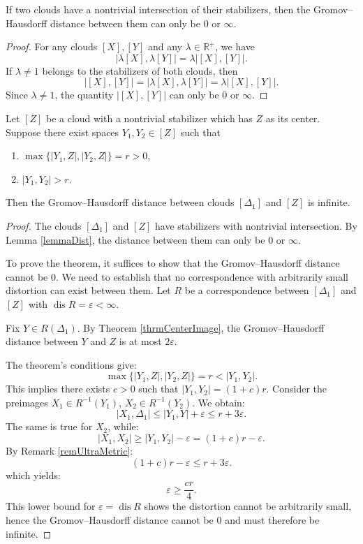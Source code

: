 \documentclass[leqno]{article}
\begin{document}
\begin{lemma}\label{lemmaDist}
    If two clouds have a nontrivial intersection of their stabilizers,
    then the Gromov--Hausdorff distance between them can only be $0$
    or $\infty$.
\end{lemma}

\begin{proof}
    For any clouds $[X], [Y]$ and any $\lambda \in \mathbb{R}^{+}$, we have
    $$
    \big|\lambda[X], \lambda[Y]\big| = \lambda\big|[X], [Y]\big|.
    $$
    If $\lambda \neq 1$ belongs to the stabilizers of both clouds, then
    $$
    \big|[X],[Y]\big| = \big|\lambda[X], \lambda[Y]\big| =
    \lambda\big|[X], [Y]\big|.
    $$
    Since $\lambda \neq 1$, the quantity $\big|[X],[Y]\big|$ can only
    be $0$ or $\infty$.
\end{proof}

\begin{theorem}\label{thrmDist}
    Let $[Z]$ be a cloud with a nontrivial stabilizer which has $Z$ as
    its center. Suppose there exist spaces $Y_{1}, Y_{2} \in [Z]$ such that
    \begin{enumerate}
        \item $\max\{ |Y_{1},Z|, |Y_{2}, Z| \} = r > 0$,
        \item $|Y_{1}, Y_{2}| > r$.
    \end{enumerate}
    Then the Gromov--Hausdorff distance between clouds $[\Delta_1]$ and
    $[Z]$ is infinite.
\end{theorem}

\begin{proof}
    The clouds $[\Delta_1]$ and $[Z]$ have stabilizers with nontrivial
    intersection. By Lemma \ref{lemmaDist}, the distance between them
    can only be $0$ or $\infty$.

    To prove the theorem, it suffices to show that the
    Gromov--Hausdorff distance cannot be $0$. We need to establish that
    no correspondence with arbitrarily small distortion can exist
    between them. Let $R$ be a correspondence between $[\Delta_1]$ and
    $[Z]$ with $\operatorname{dis} R = \varepsilon < \infty$.

    Fix $Y \in R(\Delta_1)$. By Theorem \ref{thrmCenterImage}, the
    Gromov--Hausdorff distance between $Y$ and $Z$ is at most $2\varepsilon$.

    The theorem's conditions give:
    $$
    \max\{ |Y_{1},Z|, |Y_{2}, Z| \} = r < |Y_{1}, Y_{2}|.
    $$
    This implies there exists $c > 0$ such that $|Y_{1},Y_{2}| = (1 +
    c)r$. Consider the preimages $X_1 \in R^{-1}(Y_{1})$, $X_2 \in
    R^{-1}(Y_{2})$. We obtain:
    $$
    |X_1, \Delta_1| \leq |Y_{1}, Y| + \varepsilon \leq r + 3\varepsilon.
    $$
    The same is true for $X_2$, while:
    $$
    |X_1, X_2| \geq |Y_{1}, Y_{2}| - \varepsilon = (1+c)r - \varepsilon.
    $$
    By Remark \ref{remUltraMetric}:
    $$
    (1+c)r - \varepsilon \leq r + 3\varepsilon.
    $$
    which yields:
    $$
    \varepsilon \geq \frac{cr}{4}.
    $$
    This lower bound for $\varepsilon = \operatorname{dis} R$ shows the
    distortion cannot be arbitrarily small, hence the Gromov--Hausdorff
    distance cannot be $0$ and must therefore be infinite.
\end{proof}
\end{document}
